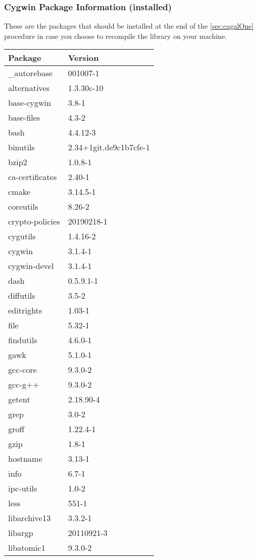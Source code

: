 \documentclass[11pt, english, openany]{report}
\begin{document}
\begin{appendices}
\subsubsection{Cygwin Package Information (installed)}
These are the packages that should be installed at the end of the \ref {sec:cagalOne} procedure in case you choose to recompile the library on your machine.
\begin{center}
\begin{tabular}{|m{4cm}|m{4cm}|}
Package & Version \\
\hline
\_autorebase & 001007-1 \\
alternatives & 1.3.30c-10 \\
base-cygwin & 3.8-1 \\
base-files & 4.3-2 \\
bash & 4.4.12-3 \\
binutils & 2.34+1git.de9c1b7cfe-1 \\
bzip2 & 1.0.8-1 \\
ca-certificates & 2.40-1 \\
cmake & 3.14.5-1 \\
coreutils & 8.26-2 \\
crypto-policies & 20190218-1 \\
cygutils & 1.4.16-2 \\
cygwin & 3.1.4-1 \\
cygwin-devel & 3.1.4-1 \\
dash & 0.5.9.1-1 \\
diffutils & 3.5-2 \\
editrights & 1.03-1 \\
file & 5.32-1 \\
findutils & 4.6.0-1 \\
gawk & 5.1.0-1 \\
gcc-core & 9.3.0-2 \\
gcc-g++ & 9.3.0-2 \\
getent & 2.18.90-4 \\
grep & 3.0-2 \\
groff & 1.22.4-1 \\
gzip & 1.8-1 \\
hostname & 3.13-1 \\
info & 6.7-1 \\
ipc-utils & 1.0-2 \\
less & 551-1 \\
libarchive13 & 3.3.2-1 \\
libargp & 20110921-3 \\
libatomic1 & 9.3.0-2 \\

\end{tabular}
\end{center}
\end{appendices}
\end{document}
